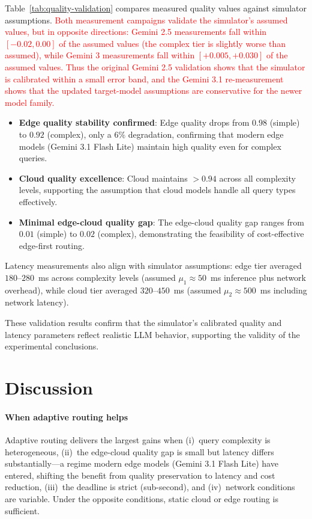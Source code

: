 \documentclass[final,3p,twocolumn,authoryear]{elsarticle}
\newcommand{\rev}[1]{\textcolor{red}{#1}}
\theoremstyle{plain}
\theoremstyle{definition}
\begin{document}
Table~\ref{tab:quality-validation} compares measured quality values against simulator assumptions.
\rev{Both measurement campaigns validate the simulator's assumed values, but in opposite directions: Gemini 2.5 measurements fall within $[-0.02, 0.00]$ of the assumed values (the complex tier is slightly worse than assumed), while Gemini 3 measurements fall within $[+0.005, +0.030]$ of the assumed values. Thus the original Gemini 2.5 validation shows that the simulator is calibrated within a small error band, and the Gemini 3.1 re-measurement shows that the updated target-model assumptions are conservative for the newer model family.}

\begin{itemize}
  \item \textbf{Edge quality stability confirmed}: Edge quality drops from $0.98$ (simple) to $0.92$ (complex), only a $6\%$ degradation, confirming that modern edge models (Gemini 3.1 Flash Lite) maintain high quality even for complex queries.
  \item \textbf{Cloud quality excellence}: Cloud maintains $>0.94$ across all complexity levels, supporting the assumption that cloud models handle all query types effectively.
  \item \textbf{Minimal edge-cloud quality gap}: The edge-cloud quality gap ranges from $0.01$ (simple) to $0.02$ (complex), demonstrating the feasibility of cost-effective edge-first routing.
\end{itemize}

Latency measurements also align with simulator assumptions: edge tier averaged $180$--$280$~ms across complexity levels (assumed $\mu_1 \approx 50$~ms inference plus network overhead), while cloud tier averaged $320$--$450$~ms (assumed $\mu_2 \approx 500$~ms including network latency).

These validation results confirm that the simulator's calibrated quality and latency parameters reflect realistic LLM behavior, supporting the validity of the experimental conclusions.

\section{Discussion}
\label{sec:discussion}

\paragraph{When adaptive routing helps}
Adaptive routing delivers the largest gains when (i)~query complexity is heterogeneous, (ii)~the edge-cloud quality gap is small but latency differs substantially---a regime modern edge models (Gemini 3.1 Flash Lite) have entered, shifting the benefit from quality preservation to latency and cost reduction, (iii)~the deadline is strict (sub-second), and (iv)~network conditions are variable. Under the opposite conditions, static cloud or edge routing is sufficient.
\end{document}
